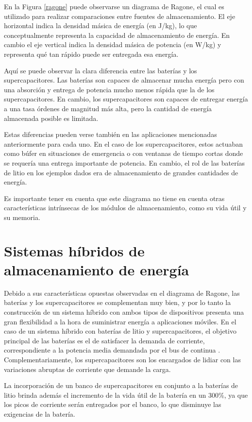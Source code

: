 En la Figura \ref{ragone} puede observarse un diagrama de Ragone, el cual es utilizado para realizar comparaciones entre fuentes de almacenamiento. El eje horizontal indica la densidad másica de energía (en J/kg), lo que conceptualmente representa la capacidad de almacenamiento de energía. En cambio el eje vertical indica la densidad másica de potencia (en W/kg) y representa qué tan rápido puede ser entregada esa energía.

Aquí se puede observar la clara diferencia entre las baterías y los supercapacitores. Las baterías son capaces de almacenar mucha energía pero con una absorción y entrega de potencia mucho menos rápida que la de los supercapacitores. En cambio, los supercapacitores son capaces de entregar energía a una tasa órdenes de magnitud más alta, pero la cantidad de 
energía almacenada posible es limitada.

Estas diferencias pueden verse también en las aplicaciones mencionadas anteriormente para cada uno. En el caso de los supercapacitores, estos actuaban como búfer en situaciones de emergencia o con ventanas de tiempo cortas donde se requería una entrega importante de potencia. En cambio, el rol de las baterías de litio en los ejemplos dados era de almacenamiento de grandes cantidades de energía.

Es importante tener en cuenta que este diagrama no tiene en cuenta otras características intrínsecas de los módulos de almacenamiento, como su vida útil y su memoria.

\section{Sistemas híbridos de almacenamiento de energía}

Debido a sus características opuestas observadas en el diagrama de Ragone, las baterías y los supercapacitores se complementan muy bien, y por lo tanto la construcción de un sistema híbrido con ambos tipos de dispositivos presenta una gran flexibilidad a la hora de suministrar energía a aplicaciones móviles. En el caso de un sistema híbrido con baterías de litio y supercapacitores, el objetivo principal de las baterías es el de satisfacer la demanda de corriente, correspondiente a la potencia media demandada por el bus de continua \cite{estimacion}. Complementariamente, los supercapacitores son los encargados de lidiar con las variaciones abruptas de corriente que demande la carga.

La incorporación de un banco de supercapacitores en conjunto a la baterías de litio brinda además el incremento de la vida útil de la batería en un 300\%, ya que los picos de corriente serán entregados por el banco, lo que disminuye las exigencias de la batería.

